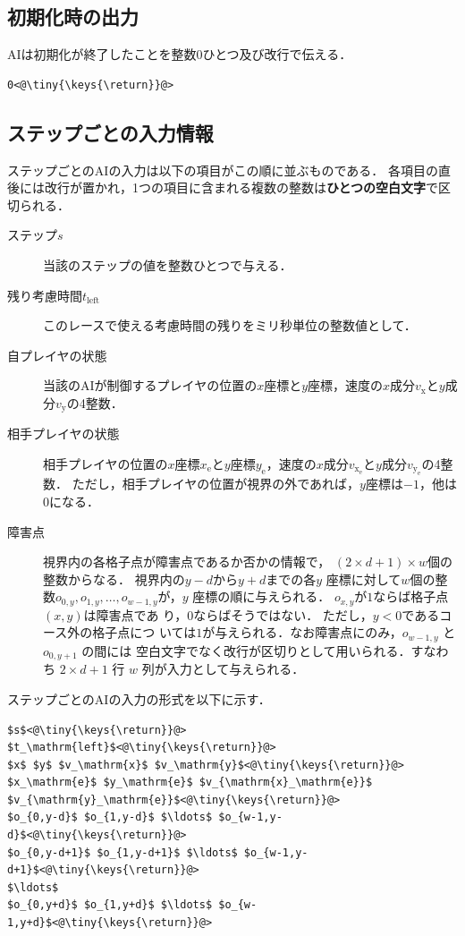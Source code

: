 \documentclass[11pt]{jarticle}
\begin{document}
\subsection{初期化時の出力}\label{sec:output_init}
AIは初期化が終了したことを整数$0$ひとつ及び改行で伝える．

\begin{lstlisting}
0<@\tiny{\keys{\return}}@>
\end{lstlisting}

\subsection{ステップごとの入力情報}
ステップごとのAIの入力は以下の項目がこの順に並ぶものである．
各項目の直後には改行が置かれ，1つの項目に含まれる複数の整数は{\bf ひとつの空白文字}で区切られる．

\begin{description}
\item[ステップ$s$] 当該のステップの値を整数ひとつで与える．
\item[残り考慮時間$t_\mathrm{left}$] このレースで使える考慮時間の残りをミリ秒単位の整数値として．
\item[自プレイヤの状態] 当該のAIが制御するプレイヤの位置の$x$座標と$y$座標，速度の$x$成分$v_\mathrm{x}$と$y$成分$v_\mathrm{y}$の4整数．
\item[相手プレイヤの状態] 相手プレイヤの位置の$x$座標$x_\mathrm{e}$と$y$座標$y_\mathrm{e}$，速度の$x$成分$v_{\mathrm{x}_\mathrm{e}}$と$y$成分$v_{\mathrm{y}_\mathrm{e}}$の4整数．
  ただし，相手プレイヤの位置が視界の外であれば，$y$座標は$-1$，他は$0$になる．
\item[障害点] 視界内の各格子点が障害点であるか否かの情報で，
  $(2\times d+1)\times w$個の整数からなる． 視界内の$y-d$から$y+d$までの各$y$
  座標に対して$w$個の整数$o_{0,y}, o_{1,y}, \ldots, o_{w-1,y}$が，$y$
  座標の順に与えられる．  $o_{x,y}$が$1$ならば格子点$(x,y)$は障害点であ
  り，$0$ならばそうではない．  ただし，$y<0$であるコース外の格子点につ
  いては$1$が与えられる．なお障害点にのみ，$o_{w-1,y}$ と $o_{0,y+1}$ の間には
  空白文字でなく改行が区切りとして用いられる．すなわち $2\times d+1$ 行 $w$ 列が入力として与えられる．
\end{description}

ステップごとのAIの入力の形式を以下に示す．
\begin{lstlisting}
$s$<@\tiny{\keys{\return}}@>
$t_\mathrm{left}$<@\tiny{\keys{\return}}@>
$x$ $y$ $v_\mathrm{x}$ $v_\mathrm{y}$<@\tiny{\keys{\return}}@>
$x_\mathrm{e}$ $y_\mathrm{e}$ $v_{\mathrm{x}_\mathrm{e}}$ $v_{\mathrm{y}_\mathrm{e}}$<@\tiny{\keys{\return}}@>
$o_{0,y-d}$ $o_{1,y-d}$ $\ldots$ $o_{w-1,y-d}$<@\tiny{\keys{\return}}@>
$o_{0,y-d+1}$ $o_{1,y-d+1}$ $\ldots$ $o_{w-1,y-d+1}$<@\tiny{\keys{\return}}@>
$\ldots$
$o_{0,y+d}$ $o_{1,y+d}$ $\ldots$ $o_{w-1,y+d}$<@\tiny{\keys{\return}}@>
\end{lstlisting}
\end{document}
